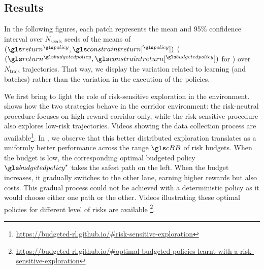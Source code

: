 \subsection{Results}
\label{subsec:results}
In the following figures, each patch represents the mean and 95\% confidence interval over $N_{\text{seeds}}$ seeds of the means of $(\return^{\policy},\constraintreturn[^{\policy}])$ ($(\return^{\budgetedpolicy},\constraintreturn[^{\budgetedpolicy}])$ for \BFTQ) over $N_\text{trajs}$ trajectories. That way, we display the variation related to learning (and batches) rather than the variation in the execution of the policies.

We first bring to light the role of risk-sensitive exploration in the  environment.  shows how the two strategies behave in the corridor environment: the risk-neutral procedure focuses on high-reward corridor only, while the risk-sensitive procedure also explores low-risk trajectories. Videos showing the data collection process are available\footnote{\href{https://budgeted-rl.github.io/\#risk-sensitive-exploration}{https://budgeted-rl.github.io/\#risk-sensitive-exploration}}. In , we observe that this better distributed exploration translates as a uniformly better performance across the range $\budgetspace$ of risk budgets. 
When the budget is low, the corresponding optimal budgeted policy $\budgetedpolicy^\star$ takes the safest path on the left. When the budget increases, it gradually switches to the other lane, earning higher rewards but also costs. This gradual process could not be achieved with a deterministic policy as it would choose either one path or the other. Videos illustrating these optimal policies for different level of risks are available \footnote{\href{https://budgeted-rl.github.io/\#optimal-budgeted-policies-learnt-with-a-risk-sensitive-exploration}{https://budgeted-rl.github.io/\#optimal-budgeted-policies-learnt-with-a-risk-sensitive-exploration}}.

